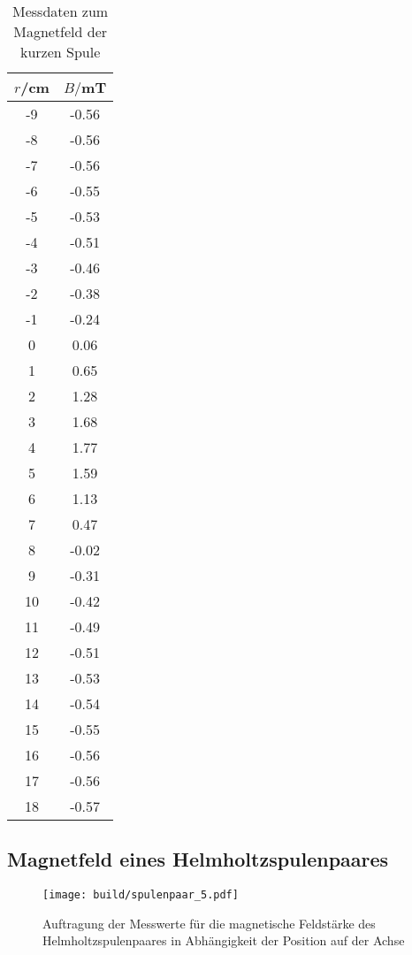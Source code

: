 \begin{table}
  \centering
  \caption{Messdaten zum Magnetfeld der kurzen Spule}
    \label{tab:kurze_spule}
    \begin{tabular}{c c}
      \toprule
      $r$/cm & $B/$mT \\
      \midrule
      -9  &	  -0.56\\
      -8  &	  -0.56\\
      -7	&  -0.56\\
      -6	&  -0.55\\
      -5	&  -0.53\\
      -4	&  -0.51\\
      -3	&  -0.46\\
      -2	&  -0.38\\
      -1	&  -0.24\\
      0	  &   0.06\\
      1	  &   0.65\\
      2	  &   1.28\\
      3	  &   1.68\\
      4	  &   1.77\\
      5	  &   1.59\\
      6	  &   1.13\\
      7	  &   0.47\\
      8	  &  -0.02\\
      9	  &  -0.31\\
      10	&  -0.42\\
      11	&  -0.49\\
      12	&  -0.51\\
      13	&  -0.53\\
      14	&  -0.54\\
      15	&  -0.55\\
      16	&  -0.56\\
      17	&  -0.56\\
      18	&  -0.57\\
      \bottomrule
    \end{tabular}
\end{table}

\subsection{Magnetfeld eines Helmholtzspulenpaares}

\begin{figure}
  \centering
  \texttt{[image: build/spulenpaar\_5.pdf]}
  \caption{Auftragung der Messwerte für die magnetische Feldstärke des Helmholtzspulenpaares
  in Abhängigkeit der Position auf der Achse}
  \label{fig:spulenpaar_5}
\end{figure}

